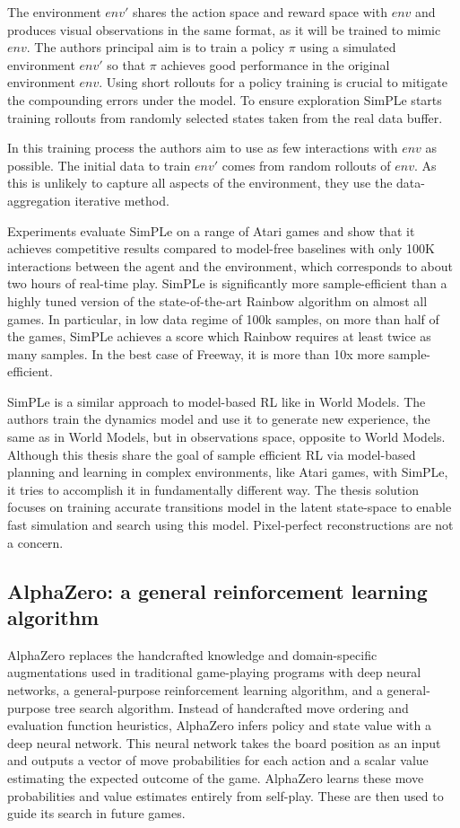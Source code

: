 The environment $env'$ shares the action space and reward space with $env$ and produces visual observations in the same format, as it will be trained to mimic $env$. The authors principal aim is to train a policy $\pi$ using a simulated environment $env'$ so that $\pi$ achieves good performance in the original environment $env$. Using short rollouts for a policy training is crucial to mitigate the compounding errors under the model. To ensure exploration SimPLe starts training rollouts from randomly selected states taken from the real data buffer.

In this training process the authors aim to use as few interactions with $env$ as possible. The initial data to train $env'$ comes from random rollouts of $env$. As this is unlikely to capture all aspects of the environment, they use the data-aggregation iterative method.

Experiments evaluate SimPLe on a range of Atari games and show that it achieves competitive results compared to model-free baselines with only 100K interactions between the agent and the environment, which corresponds to about two hours of real-time play. SimPLe is significantly more sample-efficient than a highly tuned version of the state-of-the-art Rainbow algorithm \cite{Algo.Rainbow} on almost all games. In particular, in low data regime of 100k samples, on more than half of the games, SimPLe achieves a score which Rainbow requires at least twice as many samples. In the best case of Freeway, it is more than 10x more sample-efficient.

SimPLe is a similar approach to model-based RL like in World Models. The authors train the dynamics model and use it to generate new experience, the same as in World Models, but in observations space, opposite to World Models. \\
Although this thesis share the goal of sample efficient RL via model-based planning and learning in complex environments, like Atari games, with SimPLe, it tries to accomplish it in fundamentally different way. The thesis solution focuses on training accurate transitions model in the latent state-space to enable fast simulation and search using this model. Pixel-perfect reconstructions are not a concern.

\subsection{AlphaZero: a general reinforcement learning algorithm}

AlphaZero \cite{Algo.AlphaZero} replaces the handcrafted knowledge and domain-specific augmentations used in traditional game-playing programs with deep neural networks, a general-purpose reinforcement learning algorithm, and a general-purpose tree search algorithm. Instead of handcrafted move ordering and evaluation function heuristics, AlphaZero infers policy and state value with a deep neural network. This neural network takes the board position as an input and outputs a vector of move probabilities for each action and a scalar value estimating the expected outcome of the game. AlphaZero learns these move probabilities and value estimates entirely from self-play. These are then used to guide its search in future games.

